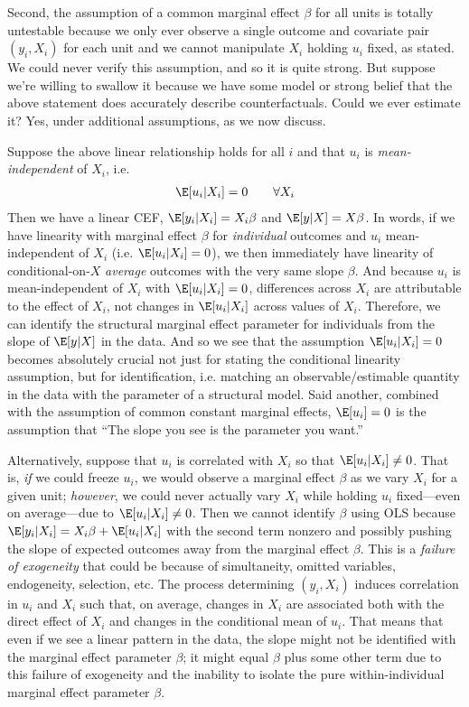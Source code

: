 \documentclass[12pt]{article}
\theoremstyle{plain}
\theoremstyle{definition}
\theoremstyle{remark}
\begin{document}
Second, the assumption of a common marginal effect $\beta$ for all
units is totally untestable because we only ever observe a single
outcome and covariate pair $(y_i,X_i)$ for each unit and we cannot
manipulate $X_i$ holding $u_i$ fixed, as stated.
We could never verify this assumption,
and so it is quite strong.
But suppose we're willing to swallow it because we have some model
or strong belief that the above statement does accurately describe
counterfactuals.
Could we ever estimate it?  Yes, under additional assumptions, as we
now discuss.

Suppose the above linear relationship holds for all $i$ and that $u_i$
is \emph{mean-independent} of $X_i$, i.e.
\begin{align*}
  \E[u_i|X_i]=0
  \qquad\forall X_i
\end{align*}
Then we have a linear CEF, $\E[y_i|X_i]=X_i\beta$ and
$\E[y|X]=X\beta$.
In words, if we have linearity with marginal effect $\beta$ for
\emph{individual} outcomes and $u_i$ mean-independent of $X_i$ (i.e.
$\E[u_i|X_i]=0$), we then immediately have linearity of
conditional-on-$X$ \emph{average} outcomes with the very same slope
$\beta$.
And because $u_i$ is mean-independent of $X_i$ with $\E[u_i|X_i]=0$,
differences across $X_i$ are attributable to the effect of $X_i$,
not changes in $\E[u_i|X_i]$ across values of $X_i$.
Therefore, we can identify the structural marginal effect parameter
for individuals from the slope of $\E[y|X]$ in the data.
And so we see that the assumption $\E[u_i|X_i]=0$
becomes absolutely crucial not just for stating the conditional
linearity assumption, but for identification, i.e. matching an
observable/estimable quantity in the data with the parameter of a
structural model.
Said another, combined with the assumption of common constant
marginal effects, $\E[u_i]=0$ is the assumption that ``The slope you
see is the parameter you want.''

Alternatively, suppose that $u_i$ is correlated with $X_i$ so that
$\E[u_i|X_i]\neq 0$.
That is, \emph{if} we could freeze $u_i$, we would observe a
marginal effect $\beta$ as we vary $X_i$ for a given unit;
\emph{however}, we could never actually vary $X_i$ while holding
$u_i$ fixed---even on average---due to $\E[u_i|X_i]\neq 0$.
Then we cannot identify $\beta$ using OLS because
$\E[y_i|X_i]=X_i\beta + \E[u_i|X_i]$ with the second term nonzero
and possibly pushing the slope of expected outcomes away from the
marginal effect $\beta$.
This is a \emph{failure of exogeneity} that could be because of
simultaneity, omitted variables, endogeneity, selection, etc.
The process determining $(y_i,X_i)$ induces correlation in $u_i$ and
$X_i$ such that, on average, changes in $X_i$ are associated both
with the direct effect of $X_i$ and changes in the conditional mean
of $u_i$.
That means that even if we see a linear pattern in the data, the
slope might not be identified with the marginal effect parameter
$\beta$; it might equal $\beta$ plus some other term due to this
failure of exogeneity and the inability to isolate the pure
within-individual marginal effect parameter $\beta$.
\end{document}
